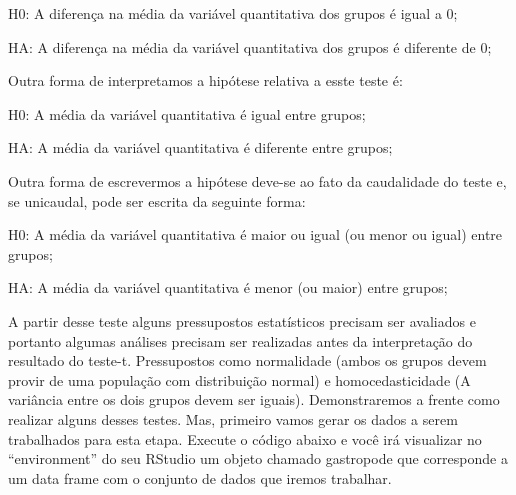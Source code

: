 \documentclass[]{book}
\begin{document}
H0: A diferença na média da variável quantitativa dos grupos é igual a 0;

HA: A diferença na média da variável quantitativa dos grupos é diferente de 0;

Outra forma de interpretamos a hipótese relativa a esste teste é:

H0: A média da variável quantitativa é igual entre grupos;

HA: A média da variável quantitativa é diferente entre grupos;

Outra forma de escrevermos a hipótese deve-se ao fato da caudalidade do teste e, se unicaudal, pode ser escrita da seguinte forma:

H0: A média da variável quantitativa é maior ou igual (ou menor ou igual) entre grupos;

HA: A média da variável quantitativa é menor (ou maior) entre grupos;

A partir desse teste alguns pressupostos estatísticos precisam ser avaliados e portanto algumas análises precisam ser realizadas antes da interpretação do resultado do teste-t. Pressupostos como normalidade (ambos os grupos devem provir de uma população com distribuição normal) e homocedasticidade (A variância entre os dois grupos devem ser iguais). Demonstraremos a frente como realizar alguns desses testes. Mas, primeiro vamos gerar os dados a serem trabalhados para esta etapa. Execute o código abaixo e você irá visualizar no ``environment'' do seu RStudio um objeto chamado gastropode que corresponde a um data frame com o conjunto de dados que iremos trabalhar.
\end{document}
